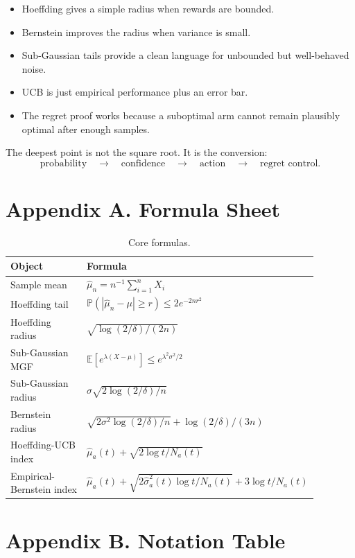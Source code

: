 \documentclass[en,nofont,11pt]{elegantbook}
\newcommand{\E}{\mathbb{E}}
\newcommand{\Pbb}{\mathbb{P}}
\begin{document}
\begin{itemize}
\item Hoeffding gives a simple radius when rewards are bounded.
\item Bernstein improves the radius when variance is small.
\item Sub-Gaussian tails provide a clean language for unbounded but well-behaved noise.
\item UCB is just empirical performance plus an error bar.
\item The regret proof works because a suboptimal arm cannot remain plausibly optimal after enough samples.
\end{itemize}

The deepest point is not the square root. It is the conversion:
\[
\text{probability} \quad\longrightarrow\quad \text{confidence} \quad\longrightarrow\quad \text{action} \quad\longrightarrow\quad \text{regret control}.
\]

\chapter*{Appendix A. Formula Sheet}

\begin{table}[H]
\centering
\caption{Core formulas.}
\begin{tabular}{p{0.36\linewidth}p{0.52\linewidth}}
\toprule
Object & Formula \\
\midrule
Sample mean & $\widehat\mu_n = n^{-1}\sum_{i=1}^{n}X_i$ \\
Hoeffding tail & $\Pbb(|\widehat\mu_n-\mu|\ge r)\le 2e^{-2nr^2}$ \\
Hoeffding radius & $\sqrt{\log(2/\delta)/(2n)}$ \\
Sub-Gaussian MGF & $\E[e^{\lambda(X-\mu)}]\le e^{\lambda^2\sigma^2/2}$ \\
Sub-Gaussian radius & $\sigma\sqrt{2\log(2/\delta)/n}$ \\
Bernstein radius & $\sqrt{2\sigma^2\log(2/\delta)/n}+\log(2/\delta)/(3n)$ \\
Hoeffding-UCB index & $\widehat\mu_a(t)+\sqrt{2\log t/N_a(t)}$ \\
Empirical-Bernstein index & $\widehat\mu_a(t)+\sqrt{2\widehat\sigma_a^2(t)\log t/N_a(t)}+3\log t/N_a(t)$ \\
\bottomrule
\end{tabular}
\end{table}

\chapter*{Appendix B. Notation Table}
\end{document}
